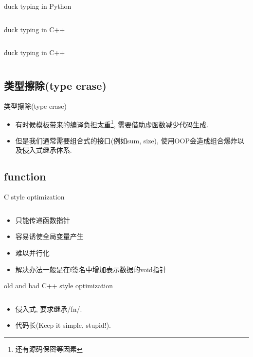 \documentclass[compress]{beamer}
\begin{document}
\begin{frame}{duck typing in Python}
    \inputminted[fontsize=\footnotesize]{python}{mean.py}
\end{frame}

\begin{frame}{duck typing in C++}
    \inputminted[fontsize=\footnotesize]{c}{mean.cpp}
\end{frame}

\begin{frame}{duck typing in C++}
    \inputminted[fontsize=\footnotesize]{c}{use_mean.cpp}
\end{frame}

\newcommand{\typeerase}{类型擦除(type erase)}
\subsection{\typeerase}

\begin{frame}{\typeerase}
    \begin{itemize}[<+->]
        \item 有时候模板带来的编译负担太重\footnote{还有源码保密等因素}, 需要借助虚函数减少代码生成.
        \item 但是我们通常需要组合式的接口(例如sum, size), 使用OOP会造成组合爆炸以及侵入式继承体系.
    \end{itemize}
\end{frame}

\subsection{function}

\begin{frame}{C style optimization}
    \inputminted[fontsize=\footnotesize]{c}{optimize.h}
    \vskip5mm
    \pause
    \begin{itemize}[<+->]
        \item 只能传递函数指针
        \item 容易诱使全局变量产生
        \item 难以并行化
        \item 解决办法一般是在f签名中增加表示数据的void指针
    \end{itemize}
\end{frame}

\begin{frame}{old and bad C++ style optimization}
    \inputminted[fontsize=\footnotesize]{c}{old_optimize.hpp}
    \vskip5mm
    \pause
    \begin{itemize}[<+->]
        \item 侵入式, 要求继承/fn/.
        \item 代码长(Keep it simple, stupid!).
    \end{itemize}
\end{frame}
\end{document}
